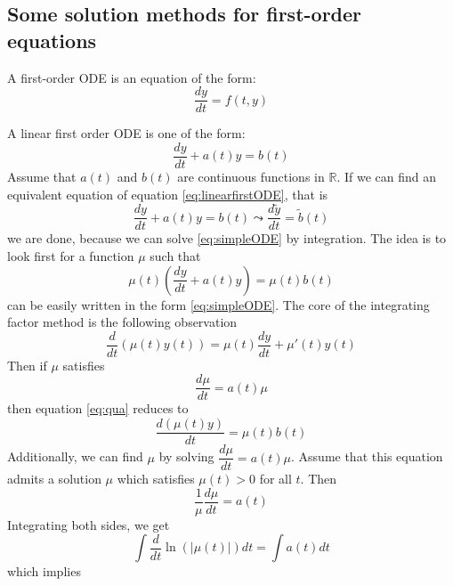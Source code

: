 \documentclass[main.tex]{subfiles}
\begin{document}
\subsection{Some solution methods for first-order equations}
\par A first-order ODE is an equation of the form: 
\begin{equation}
    \dfrac{dy}{dt} = f(t,y)
\end{equation}
\par A linear first order ODE is one of the form: 
\begin{equation}\label{eq:linearfirstODE}
    \dfrac{dy}{dt} + a(t)y = b(t)
\end{equation}
Assume that $a(t)$ and $b(t)$ are continuous functions in $\mathbb{R}$. If we can find an equivalent equation of equation \ref{eq:linearfirstODE}, that is 
\begin{equation}\label{eq:simpleODE}
    \dfrac{dy}{dt} + a(t)y = b(t) \leadsto \dfrac{d \tilde{y}}{dt} = \tilde{b}(t)
\end{equation}
we are done, because we can solve \ref{eq:simpleODE} by integration. The idea is to look first for a function $\mu$ such that 
\begin{equation}\label{eq:qua}
    \mu (t) (\dfrac{dy}{dt} + a(t)y) = \mu(t) b(t)
\end{equation}
can be easily written in the form \ref{eq:simpleODE}. 
 The core of the integrating factor method is the following observation 
\begin{equation}
    \dfrac{d}{dt}(\mu(t) y(t)) = \mu(t) \dfrac{dy}{dt} + \mu'(t) y(t)
\end{equation} 
 Then if $\mu$ satisfies 
\begin{equation}
    \dfrac{d\mu }{dt} = a(t) \mu 
\end{equation}
then equation \ref{eq:qua} reduces to 
\begin{equation}
    \dfrac{d(\mu(t)y)}{dt} = \mu(t) b(t)
\end{equation}
Additionally, we can find $\mu$ by solving $\dfrac{d\mu}{dt} = a(t) \mu$. 
 Assume that this equation admits a solution $\mu$ which satisfies $\mu(t) > 0$ for all $t$. Then 
\begin{equation}
    \dfrac{1}{\mu} \dfrac{d\mu}{dt}  = a(t)
\end{equation}
Integrating both sides, we get 
\begin{equation}
    \int \dfrac{d}{dt} \ln(|\mu(t)|) dt = \int a(t) dt
\end{equation}
which implies 
\end{document}
